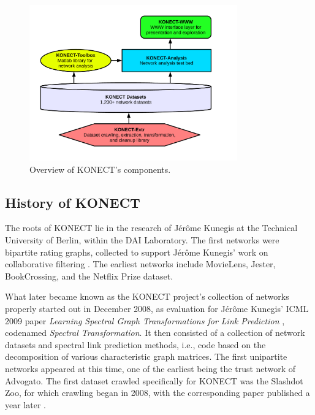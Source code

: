 \documentclass{article}
\newcommand{\wOnePointFive}{0.8\textwidth}
\begin{document}
\begin{figure}
  \centering
  \includegraphics[width=\wOnePointFive]{organization.white}
  \caption{
    \label{fig:organization}
    Overview of KONECT's components. 
  }
\end{figure}

\subsection{History of KONECT}
The roots of KONECT lie in the research of Jérôme Kunegis at the
Technical University of Berlin, within the DAI Laboratory.  The first
networks were bipartite rating graphs, collected to support Jérôme
Kunegis' work on collaborative filtering
\citep{kunegis:negative-resistance,kunegis:adapting-ratings}.  The
earliest networks include MovieLens, Jester, BookCrossing, and the Netflix Prize
dataset. 

What later became known as the KONECT project's collection of networks
properly started out in December 2008,
as evaluation for Jérôme Kunegis' ICML 2009
paper \emph{Learning Spectral Graph Transformations for Link Prediction}
\citep{kunegis:spectral-transformation}, codenamed \emph{Spectral
  Transformation}.  It then consisted of a collection of network
datasets and spectral link prediction methods, i.e., code based on the
decomposition of various characteristic graph matrices.  
The first unipartite networks appeared at this time, one of the earliest
being the trust network of Advogato. 
The first dataset crawled specifically for KONECT was the Slashdot Zoo,
for which crawling began in 2008, with the corresponding paper published
a year later \citep{kunegis:slashdot-zoo}. 
\end{document}
